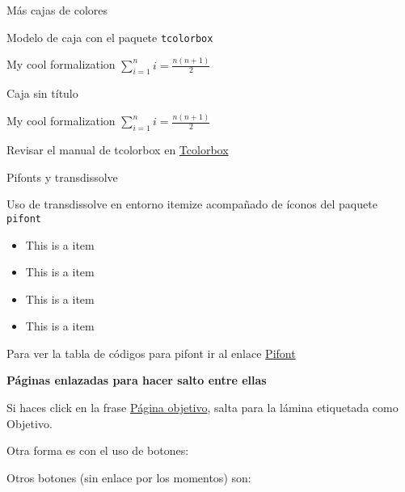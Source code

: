 \documentclass{beamer}
\begin{document}


\begin{frame}{Más cajas de colores}

Modelo de caja con el paquete {\tt tcolorbox}

\begin{tcolorbox}[colback=blue!5,colframe=blue!75!black,title=My title]
  My cool formalization
  \tcblower
  $\displaystyle\sum\limits_{i=1}^n i = \frac{n(n+1)}{2}$
\end{tcolorbox}

Caja sin título

\begin{tcolorbox}[colback=blue!5,colframe=blue!75!black]
  My cool formalization
  \tcblower
  $\displaystyle\sum\limits_{i=1}^n i = \frac{n(n+1)}{2}$
\end{tcolorbox}

Revisar el manual de tcolorbox en \href{http://get-software.net/macros/latex/contrib/tcolorbox/tcolorbox.pdf}{Tcolorbox}

\end{frame}



\begin{frame}[label=regreso]{Pifonts y transdissolve}


Uso de transdissolve en entorno itemize acompañado de íconos del paquete {\tt pifont}

\begin{itemize}
 \item<1->[\ding{165}] This is a item
 \item<2->[\ding{34}] This is a item
 \item<3->[\ding{114}] This is a item
 \item<4->[\ding{96}] This is a item
\end{itemize}
Para ver la tabla de códigos para pifont ir al enlace \href{http://willbenton.com/wb-images/pifont.pdf}{Pifont}

\vspace{0.2cm}%

{\bf \large Páginas enlazadas para hacer salto entre ellas}

Si haces click en la frase \hyperlink{Objetivo}{Página objetivo}, salta para la lámina etiquetada como Objetivo.

Otra forma es con el uso de botones:

\hyperlink{Objetivo}{}

Otros botones (sin enlace por los momentos) son:

\end{frame}
\end{document}

